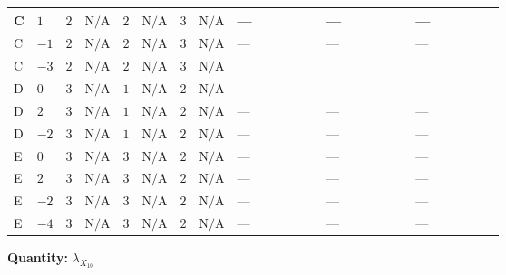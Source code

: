 \documentclass[8pt]{article}
\begin{document}
\begin{landscape}
\begin{longtable}{@{}llcccccc >{\raggedright\arraybackslash}p{0.21\linewidth} >{\raggedright\arraybackslash}p{0.21\linewidth} >{\raggedright\arraybackslash}p{0.21\linewidth}@{}}
\midrule
C & $1$ & $2$ & $\text{N/A}$ & $2$ & $\text{N/A}$ & $3$ & $\text{N/A}$ & --- & --- & --- \\
\midrule
C & $-1$ & $2$ & $\text{N/A}$ & $2$ & $\text{N/A}$ & $3$ & $\text{N/A}$ & --- & --- & --- \\
\midrule
C & $-3$ & $2$ & $\text{N/A}$ & $2$ & $\text{N/A}$ & $3$ & $\text{N/A}$ & \scriptsize\adjustbox{max width=\linewidth}{$\begin{gathered} +2 {\lambda_1} {\lambda_{X_{10}}}\end{gathered}$} & \scriptsize\adjustbox{max width=\linewidth}{$\begin{gathered} +8 {\lambda_{HS_2}^{(1)}} {\lambda_{X_{10}}}\end{gathered}$} & \scriptsize\adjustbox{max width=\linewidth}{$\begin{gathered} -4 {\lambda_{HS_2}^{(A)}} {\lambda_{X_{10}}}\end{gathered}$} \\
\midrule
D & $0$ & $3$ & $\text{N/A}$ & $1$ & $\text{N/A}$ & $2$ & $\text{N/A}$ & --- & --- & --- \\
\midrule
D & $2$ & $3$ & $\text{N/A}$ & $1$ & $\text{N/A}$ & $2$ & $\text{N/A}$ & --- & --- & --- \\
\midrule
D & $-2$ & $3$ & $\text{N/A}$ & $1$ & $\text{N/A}$ & $2$ & $\text{N/A}$ & --- & --- & --- \\
\midrule
E & $0$ & $3$ & $\text{N/A}$ & $3$ & $\text{N/A}$ & $2$ & $\text{N/A}$ & --- & --- & --- \\
\midrule
E & $2$ & $3$ & $\text{N/A}$ & $3$ & $\text{N/A}$ & $2$ & $\text{N/A}$ & --- & --- & --- \\
\midrule
E & $-2$ & $3$ & $\text{N/A}$ & $3$ & $\text{N/A}$ & $2$ & $\text{N/A}$ & --- & --- & --- \\
\midrule
E & $-4$ & $3$ & $\text{N/A}$ & $3$ & $\text{N/A}$ & $2$ & $\text{N/A}$ & --- & --- & --- \\
\midrule
\bottomrule
\end{longtable}
\clearpage
\noindent\textbf{Quantity: }${\lambda_{X_{10}}}$\par\smallskip

\end{landscape}
\end{document}
